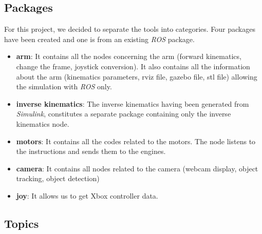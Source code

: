 \subsection{Packages}
For this project, we decided to separate the tools into categories. Four packages have been created and one is from an existing \textit{ROS} package.
\begin{itemize}
    \item \textbf{arm}: It contains all the nodes concerning the arm (forward kinematics, change the frame, joystick conversion). It also contains all the information about the arm (kinematics parameters, rviz file, gazebo file, stl file) allowing the simulation with \textit{ROS} only.
    \item \textbf{inverse kinematics}: The inverse kinematics having been generated from \textit{Simulink}, constitutes a separate package containing only the inverse kinematics node.
    \item  \textbf{motors}: It contains all the codes related to the motors. The node listens to the instructions and sends them to the engines.
    \item  \textbf{camera}: It contains all nodes related to the camera (webcam display, object tracking, object detection)
    \item  \textbf{joy}: It allows us to get Xbox controller data.
\end{itemize}

\subsection{Topics}

